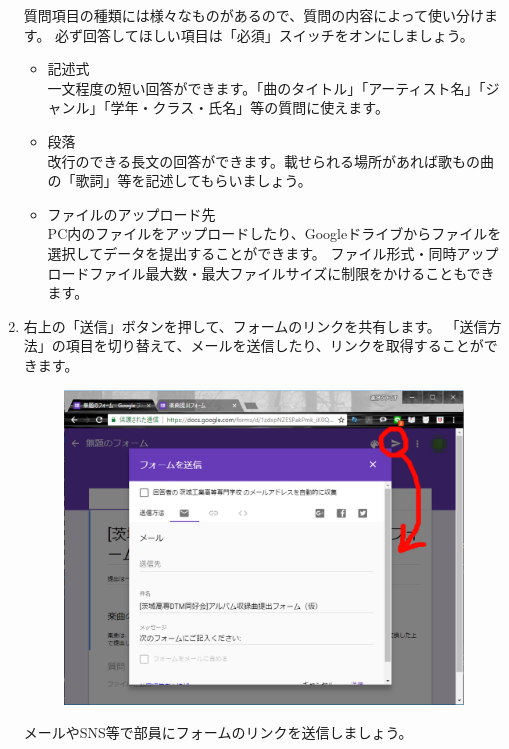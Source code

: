 \documentclass[11pt,a4paper]{jsarticle}
\begin{document}
\begin{enumerate}
                    質問項目の種類には様々なものがあるので、質問の内容によって使い分けます。
                    必ず回答してほしい項目は「必須」スイッチをオンにしましょう。
                    \begin{itemize}
                        \item 記述式 \\
                            一文程度の短い回答ができます。「曲のタイトル」「アーティスト名」「ジャンル」「学年・クラス・氏名」等の質問に使えます。
                        \item 段落 \\
                            改行のできる長文の回答ができます。載せられる場所があれば歌もの曲の「歌詞」等を記述してもらいましょう。
                        \item ファイルのアップロード先 \\
                            PC内のファイルをアップロードしたり、Googleドライブからファイルを選択してデータを提出することができます。
                            ファイル形式・同時アップロードファイル最大数・最大ファイルサイズに制限をかけることもできます。
                    \end{itemize}

                \item 右上の「送信」ボタンを押して、フォームのリンクを共有します。
                    「送信方法」の項目を切り替えて、メールを送信したり、リンクを取得することができます。
                    \begin{figure}[htbp]
                        \begin{center}
                        \includegraphics[width=12.0cm]{./form04.eps}
                        \label{fig:form04}
                        \end{center}
                    \end{figure}
                    メールやSNS等で部員にフォームのリンクを送信しましょう。


\end{enumerate}
\end{document}
